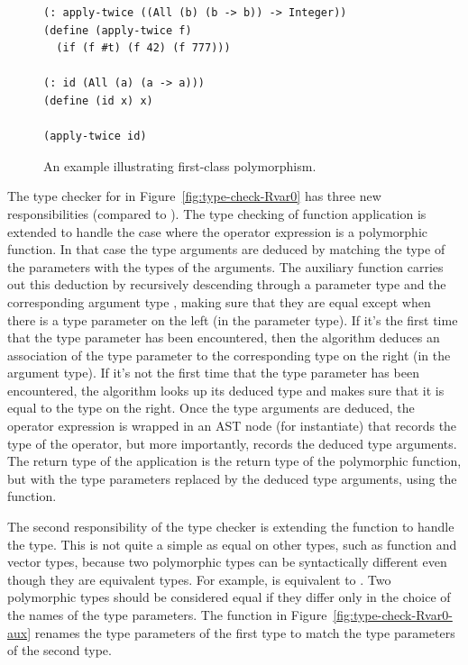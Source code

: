 \documentclass[11pt]{book}
\begin{document}
\begin{figure}[tbp]
\begin{lstlisting}
(: apply-twice ((All (b) (b -> b)) -> Integer))
(define (apply-twice f)
  (if (f #t) (f 42) (f 777)))

(: id (All (a) (a -> a)))
(define (id x) x)

(apply-twice id)
\end{lstlisting}
\caption{An example illustrating first-class polymorphism.}
\label{fig:apply-twice}
\end{figure}

The type checker for \LangPoly{} in Figure~\ref{fig:type-check-Rvar0} has
three new responsibilities (compared to \LangLoop{}). The type checking of
function application is extended to handle the case where the operator
expression is a polymorphic function. In that case the type arguments
are deduced by matching the type of the parameters with the types of
the arguments.
%
The  auxiliary function carries out this deduction
by recursively descending through a parameter type  and the
corresponding argument type , making sure that they are equal
except when there is a type parameter on the left (in the parameter
type). If it's the first time that the type parameter has been
encountered, then the algorithm deduces an association of the type
parameter to the corresponding type on the right (in the argument
type). If it's not the first time that the type parameter has been
encountered, the algorithm looks up its deduced type and makes sure
that it is equal to the type on the right.
%
Once the type arguments are deduced, the operator expression is
wrapped in an  AST node (for instantiate) that records the
type of the operator, but more importantly, records the deduced type
arguments. The return type of the application is the return type of
the polymorphic function, but with the type parameters replaced by the
deduced type arguments, using the  function.

The second responsibility of the type checker is extending the
function  to handle the  type.  This is
not quite a simple as equal on other types, such as function and
vector types, because two polymorphic types can be syntactically
different even though they are equivalent types. For example,
 is equivalent to .
Two polymorphic types should be considered equal if they differ only
in the choice of the names of the type parameters. The
 function in Figure~\ref{fig:type-check-Rvar0-aux}
renames the type parameters of the first type to match the type
parameters of the second type.
\end{document}
